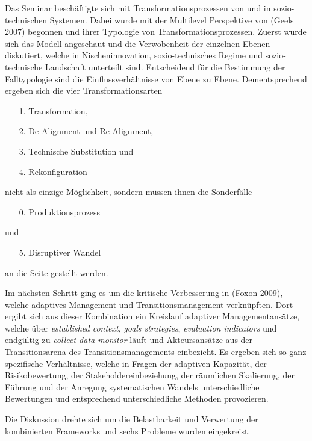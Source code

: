 \documentclass[11pt,a4paper]{article}
\begin{document}
Das Seminar beschäftigte sich mit Transformationsprozessen von und in
sozio-technischen Systemen. Dabei wurde mit der Multilevel Perspektive von
(Geels 2007) begonnen und ihrer Typologie von Transformationsprozessen. Zuerst
wurde sich das Modell angeschaut und die Verwobenheit der einzelnen Ebenen
diskutiert, welche in Nischeninnovation, sozio-technisches Regime und
sozio-technische Landschaft unterteilt sind. Entscheidend für die Bestimmung
der Falltypologie sind die Einflussverhältnisse von Ebene zu Ebene.
Dementsprechend ergeben sich die vier Transformationsarten 
\begin{itemize}[noitemsep]
\item[1.] Transformation,
\item[2.] De-Alignment und Re-Alignment,
\item[3.] Technische Substitution und
\item[4.] Rekonfiguration
\end{itemize}
nicht als einzige Möglichkeit, sondern müssen ihnen die Sonderfälle
\begin{enumerate}[noitemsep]
\item[0.] Produktionsprozess
\end{enumerate}
und
\begin{enumerate}[noitemsep]
\item[5.] Disruptiver Wandel
\end{enumerate}
an die Seite gestellt werden.

Im nächsten Schritt ging es um die kritische Verbesserung in (Foxon 2009),
welche adaptives Management und Transitionsmanagement verknüpften. Dort ergibt
sich aus dieser Kombination ein Kreislauf adaptiver Managementansätze, welche
über \emph{established context}, \emph{goals strategies}, \emph{evaluation
  indicators} und endgültig zu \emph{collect data monitor} läuft und
Akteursansätze aus der Transitionsarena des Transitionsmanagements
einbezieht. Es ergeben sich so ganz spezifische Verhältnisse, welche in Fragen
der adaptiven Kapazität, der Risikobewertung, der Stakeholdereinbeziehung, der
räumlichen Skalierung, der Führung und der Anregung systematischen Wandels
unterschiedliche Bewertungen und entsprechend unterschiedliche Methoden
provozieren.

Die Diskussion drehte sich um die Belastbarkeit und Verwertung der
kombinierten Frameworks und sechs Probleme wurden eingekreist.
\end{document}
